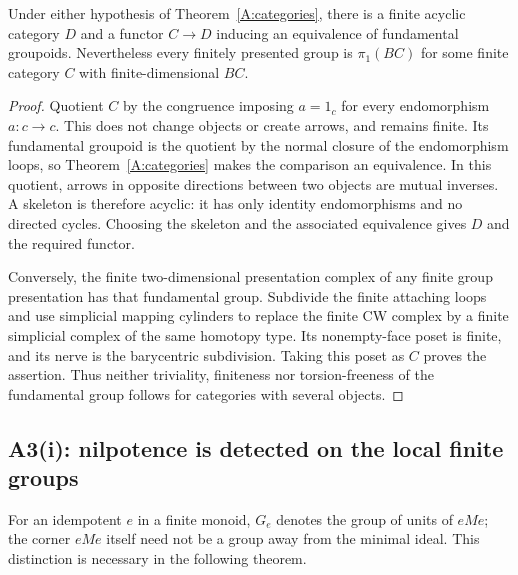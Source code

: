 \begin{proposition}\label{A:quotient}
Under either hypothesis of Theorem~\ref{A:categories}, there is a
finite acyclic category $D$ and a functor $C\to D$ inducing an equivalence
of fundamental groupoids. Nevertheless every finitely presented group is
$\pi_1(BC)$ for some finite category $C$ with finite-dimensional $BC$.
\end{proposition}
\begin{proof}
Quotient $C$ by the congruence imposing $a=1_c$ for every endomorphism
$a:c\to c$. This does not change objects or create arrows, and remains
finite. Its fundamental groupoid is the quotient by the normal closure of
the endomorphism loops, so Theorem~\ref{A:categories} makes the comparison
an equivalence. In this quotient, arrows in opposite directions between
two objects are mutual inverses. A skeleton is therefore acyclic: it has
only identity endomorphisms and no directed cycles. Choosing the skeleton
and the associated equivalence gives $D$ and the required functor.

Conversely, the finite two-dimensional presentation complex of any finite
group presentation has that fundamental group. Subdivide the finite
attaching loops and use simplicial mapping cylinders to replace the finite
CW complex by a finite simplicial complex of the same homotopy type.
Its nonempty-face poset is finite, and its nerve is the barycentric
subdivision. Taking this poset as $C$ proves the assertion. Thus neither
triviality, finiteness nor torsion-freeness of the fundamental group follows
for categories with several objects.
\end{proof}

\subsection{A3(i): nilpotence is detected on the local finite groups}

For an idempotent $e$ in a finite monoid, $G_e$ denotes the group of units
of $eMe$; the corner $eMe$ itself need not be a group away from the minimal
ideal. This distinction is necessary in the following theorem.

